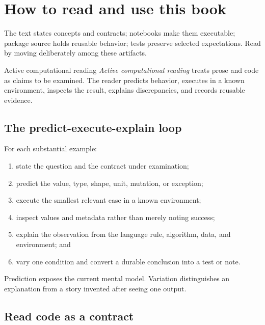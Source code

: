 
\section{How to read and use this book}

The text states concepts and contracts; notebooks make them executable; package
source holds reusable behavior; tests preserve selected expectations. Read by
moving deliberately among these artifacts.

\begin{definitionbox}{Active computational reading}
\emph{Active computational reading} treats prose and code as claims to be
examined. The reader predicts behavior, executes in a known environment,
inspects the result, explains discrepancies, and records reusable evidence.
\end{definitionbox}

\subsection{The predict-execute-explain loop}

For each substantial example:

\begin{enumerate}
  \item state the question and the contract under examination;
  \item predict the value, type, shape, unit, mutation, or exception;
  \item execute the smallest relevant case in a known environment;
  \item inspect values and metadata rather than merely noting success;
  \item explain the observation from the language rule, algorithm, data, and
  environment; and
  \item vary one condition and convert a durable conclusion into a test or note.
\end{enumerate}

Prediction exposes the current mental model. Variation distinguishes an
explanation from a story invented after seeing one output.

\subsection{Read code as a contract}

